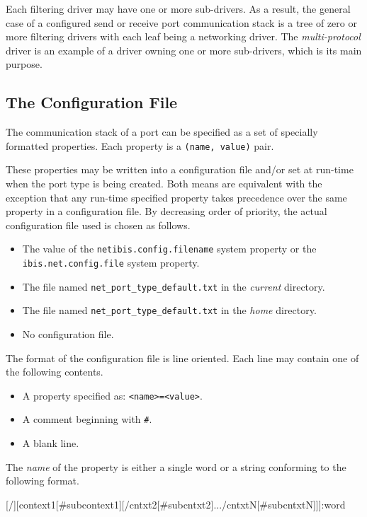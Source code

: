 \documentclass[11pt]{book}
\begin{document}
Each filtering driver may have one or more sub-drivers. As a result,
the general case of a configured send or receive port communication
stack is a tree of zero or more filtering drivers with each leaf being
a networking driver. The \textit{multi-protocol} driver is an example
of a driver owning one or more sub-drivers, which is its main purpose.

\subsection{The Configuration File}
\label{sec:configuration-file}

The communication stack of a port can be specified as a set of
specially formatted properties. Each property is a \texttt{(name,
  value)} pair.

These properties may be written into a configuration file and/or set
at run-time when the port type is being created. Both means are
equivalent with the exception that any run-time specified property
takes precedence over the same property in a configuration file. By
decreasing order of priority, the actual configuration file used is
chosen as follows.

\begin{itemize}
\item The value of the \texttt{netibis.config.filename} system
  property or the \texttt{ibis.net.config.file} system property.
\item The file named \texttt{net\_port\_type\_default.txt} in the
  \emph{current} directory.
\item The file named \texttt{net\_port\_type\_default.txt} in the
  \emph{home} directory.
\item No configuration file.
\end{itemize}

The format of the configuration file is line oriented. Each line may
contain one of the following contents.

\begin{itemize}
\item A property specified as: \texttt{<name>=<value>}.
\item A comment beginning with \texttt{\#}.
\item A blank line.
\end{itemize}

The \emph{name} of the
property is either a single word or a string conforming to the
following format.

\begin{Miniverb}

  [/][context1[#subcontext1][/cntxt2[#subcntxt2].../cntxtN[#subcntxtN]]]:word

\end{Miniverb}
\end{document}
